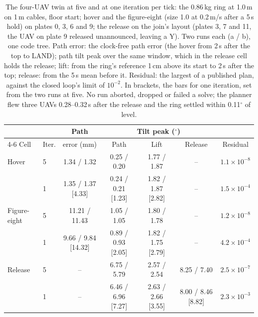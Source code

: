 \begin{table}[htbp]
\centering
\footnotesize
\setlength{\tabcolsep}{2.4pt}
\caption[Four UAVs at five and at one iteration]{The four-UAV twin at five and at one iteration per tick: the 0.86\,kg
ring at 1.0\,m on 1\,m cables, floor start; hover and the figure-eight (size 1.0 at 0.2\,m/s after a 5\,s hold) on
plates 0, 3, 6 and 9; the release on the join's layout (plates 3, 7 and 11, the UAV on plate 9 released unannounced,
leaving a Y). Two runs each (a / b), one code tree. Path error: the clock-free path error (the hover from 2\,s after
the top to LAND); path tilt peak over the same window, which in the release cell holds the release; lift: from the ring's
reference 1\,cm above its start to 2\,s after the top; release: from the 5\,s mean before it. Residual: the largest
of a published plan, against the closed loop's limit of $10^{-2}$. In brackets, the bars for one iteration, set from
the two runs at five. No run aborted, dropped or failed a solve; the planner flew three UAVs 0.28--0.32\,s after the
release and the ring settled within 0.11$^\circ$ of level.}
\label{tab:scale_c}
\begin{tabular}{llccccc}
\toprule
 & & Path & \multicolumn{3}{c}{Tilt peak ($^\circ$)} & \\
\cmidrule(lr){4-6}
Cell & Iter. & error (mm) & Path & Lift & Release & Residual \\
\midrule
Hover & 5 & 1.34 / 1.32 & 0.25 / 0.20 & 1.77 / 1.87 & -- & $1.1{\times}10^{-8}$ \\
 & 1 & 1.35 / 1.37 [4.33] & 0.24 / 0.21 [1.23] & 1.82 / 1.87 [2.82] & -- & $1.5{\times}10^{-4}$ \\
\addlinespace
Figure-eight & 5 & 11.21 / 11.43 & 1.05 / 1.05 & 1.80 / 1.78 & -- & $1.2{\times}10^{-8}$ \\
 & 1 & 9.66 / 9.84 [14.32] & 0.89 / 0.93 [2.05] & 1.82 / 1.75 [2.79] & -- & $4.2{\times}10^{-4}$ \\
\addlinespace
Release & 5 & -- & 6.75 / 5.79 & 2.57 / 2.54 & 8.25 / 7.40 & $2.5{\times}10^{-7}$ \\
 & 1 & -- & 6.46 / 6.96 [7.27] & 2.63 / 2.66 [3.55] & 8.00 / 8.46 [8.82] & $2.3{\times}10^{-3}$ \\
\bottomrule
\end{tabular}
\end{table}

